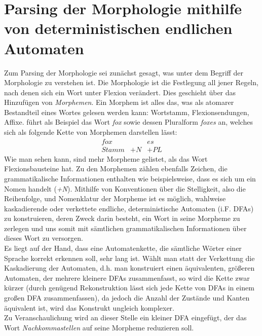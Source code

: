 \documentclass[12pt,twoside]{article}
\theoremstyle{plain}
\theoremstyle{definition}
\theoremstyle{remark}
\begin{document}
\section{Parsing der Morphologie mithilfe von deterministischen endlichen Automaten}
\label{sec:pars}
Zum Parsing der Morphologie sei zunächst gesagt, was unter dem Begriff der Morphologie zu verstehen ist.
Die Morphologie ist die Festlegung all jener Regeln, nach denen sich ein Wort unter Flexion verändert.
Dies geschieht über das Hinzufügen von \textit{Morphemen}.
Ein Morphem ist alles das, was als atomarer Bestandteil eines Wortes gelesen werden kann: Wortstamm, Flexionsendungen, Affixe.
\cite{Jur2009} führt als Beispiel das Wort \textit{fox} sowie dessen Pluralform \textit{foxes} an, welches sich als folgende Kette von Morphemen darstellen lässt:\\
\begin{equation*}
\begin{array}{ccc}
	fox & & es	\\
	Stamm & +N & +PL
\end{array}
\end{equation*}
Wie man sehen kann, sind mehr Morpheme gelistet, als das Wort Flexionsbausteine hat.
Zu den Morphemen zählen ebenfalls Zeichen, die grammatikalische Informationen enthalten wie beispielsweise, dass es sich um ein Nomen handelt (\textit{+N}).
Mithilfe von Konventionen über die Stelligkeit, also die Reihenfolge, und Nomenklatur der Morpheme ist es möglich, wahlweise kaskadierende oder verkettete endliche, deterministische Automaten (i.F. DFAs) zu konstruieren, deren Zweck darin besteht, ein Wort in seine Morpheme zu zerlegen und uns somit mit sämtlichen grammatikalischen Informationen über dieses Wort zu versorgen.\\
Es liegt auf der Hand, dass eine Automatenkette, die sämtliche Wörter einer Sprache korrekt erkennen soll, sehr lang ist.
Wählt man statt der Verkettung die Kaskadierung der Automaten, d.h. man konstruiert einen äquivalenten, größeren Automaten, der mehrere kleinere DFAs zusammenfasst, so wird die Kette zwar kürzer (durch genügend Rekonstruktion lässt sich jede Kette von DFAs in einem großen DFA zusammenfassen), da jedoch die Anzahl der Zustände und Kanten äquivalent ist, wird das Konstrukt ungleich komplexer.\\
Zu Veranschaulichung wird an dieser Stelle ein kleiner DFA eingefügt, der das Wort \textit{Nachkommastellen} auf seine Morpheme reduzieren soll.\\
\end{document}
